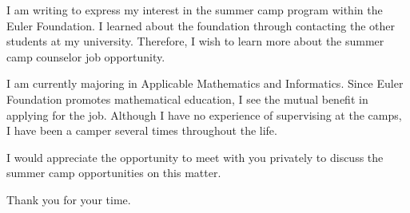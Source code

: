 \documentclass[10pt,busletter,dateno]{newlfm}
\begin{document}
	\begin{newlfm}
		I am writing to express my interest in the summer camp program within the Euler Foundation. I learned about the foundation through contacting the other students at my university. Therefore, I wish to learn more about the summer camp counselor job opportunity.
		 
		I am currently majoring in Applicable Mathematics and Informatics. Since Euler Foundation promotes mathematical education, I see the mutual benefit in applying for the job. Although I have no experience of supervising at the camps, I have been a camper several times throughout the life.  
		
		I would appreciate the opportunity to meet with you privately to discuss the summer camp opportunities on this matter.
		
		Thank you for your time.
	\end{newlfm}
\end{document}
